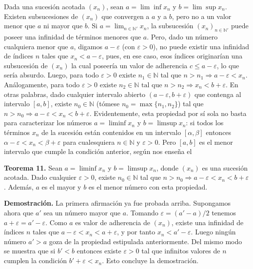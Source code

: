 \documentclass[12pt,oneside]{book}
\begin{document}
Dada una sucesión acotada \( (x_n) \), sean \( a = \lim \inf x_n \) y \( b = \lim \sup x_n \). Existen subsucesiones de \( (x_n) \) que convergen a \( a \) y a \( b \), pero no a un valor menor que \( a \) ni mayor que \( b \). Si \( a = \lim_{n \in \mathbb{N}'} x_n \), la subsucesión \( (x_n)_{n \in \mathbb{N}'} \) puede poseer una infinidad de términos menores que \( a \). Pero, dado un número cualquiera menor que \( a \), digamos \( a - \varepsilon \) (con \( \varepsilon > 0 \)), no puede existir una infinidad de índices \( n \) tales que \( x_n < a - \varepsilon \), pues, en ese caso, esos índices originarían una subsucesión de \( (x_n) \) la cual poseería un valor de adherencia \( c \leq a - \varepsilon \), lo que sería absurdo. Luego, para todo \( \varepsilon > 0 \) existe \( n_1 \in \mathbb{N} \) tal que \( n > n_1 \Rightarrow a - \varepsilon < x_n \). Análogamente, para todo \( \varepsilon > 0 \) existe \(n_2 \in \mathbb{N} \text{ tal que } n > n_2 \Rightarrow x_n < b + \varepsilon\). En otras palabras, dado cualquier intervalo abierto \((a - \varepsilon, b + \varepsilon)\) que contenga al intervalo \([a, b]\), existe \(n_0 \in \mathbb{N}\) (tómese \(n_0 = \max\{n_1, n_2\}\)) tal que \(n > n_0 \Rightarrow a - \varepsilon < x_n < b + \varepsilon\). Evidentemente, esta propiedad por sí sola no basta para caracterizar los números \(a = \liminf x_n\) y \(b = \limsup x_n\): si todos los términos \(x_n\) de la sucesión están contenidos en un intervalo \([\alpha, \beta]\) entonces \(\alpha - \varepsilon < x_n < \beta + \varepsilon\) para cualesquiera \(n \in \mathbb{N}\) y \(\varepsilon > 0\). Pero \([a, b]\) es el menor intervalo que cumple la condición anterior, según nos enseña el

\textbf{Teorema 11.} Sean \(a = \liminf x_n\) y \(b = \limsup x_n\), donde \((x_n)\) es una sucesión acotada. Dado cualquier \(\varepsilon > 0\), existe \(n_0 \in \mathbb{N}\) tal que \(n > n_0 \Rightarrow a - \varepsilon < x_n < b + \varepsilon\). Además, \(a\) es el mayor y \(b\) es el menor número con esta propiedad.

\textbf{Demostración.} La primera afirmación ya fue probada arriba. Supongamos ahora que \(a'\) sea un número mayor que \(a\). Tomando \(\varepsilon = (a' - a)/2\) tenemos \(a + \varepsilon = a' - \varepsilon\). Como \(a\) es valor de adherencia de \((x_n)\), existe una infinidad de índices \(n\) tales que \(a - \varepsilon < x_n < a + \varepsilon\), y por tanto \(x_n < a' - \varepsilon\). Luego ningún número \(a' > a\) goza de la propiedad estipulada anteriormente. Del mismo modo se muestra que si \(b' < b\) entonces existe \(\varepsilon > 0\) tal que infinitos valores de \(n\) cumplen la condición \(b' + \varepsilon < x_n\). Esto concluye la demostración.
\end{document}
